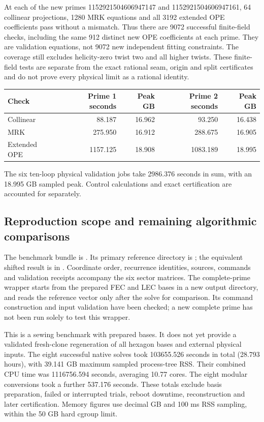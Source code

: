 \documentclass[11pt]{article}
\begin{document}
At each of the new primes 1152921504606947147 and 1152921504606947161,
64 collinear projections, 1280 MRK equations and all 3192 extended OPE
coefficients pass without a mismatch. Thus there are 9072 successful
finite-field checks, including the same 912 distinct new OPE coefficients
at each prime. They are validation equations, not 9072 new independent
fitting constraints. The coverage still excludes helicity-zero twist two
and all higher twists. These finite-field tests are separate from the exact
rational seam, origin and split certificates and do not prove every
physical limit as a rational identity.

\begin{center}
\begin{tabular}{lrrrr}\toprule
Check & Prime 1 seconds & Peak GB & Prime 2 seconds & Peak GB\\\midrule
Collinear & 88.187 & 16.962 & 93.250 & 16.438\\
MRK & 275.950 & 16.912 & 288.675 & 16.905\\
Extended OPE & 1157.125 & 18.908 & 1083.189 & 18.995\\
\bottomrule
\end{tabular}
\end{center}
The six ten-loop physical validation jobs take 2986.376 seconds
in sum, with an 18.995 GB sampled peak. Control calculations and exact
certification are accounted for separately.

\subsection{Reproduction scope and remaining algorithmic comparisons}
The benchmark bundle is . Its primary
reference directory is ; the equivalent shifted result
is in . Coordinate order, recurrence identities, sources,
commands and validation receipts accompany the six sector matrices. The
complete-prime wrapper starts from the prepared FEC and LEC bases in a new
output directory, and reads the reference vector only after the solve for
comparison. Its command construction and input validation have been checked;
a new complete prime has not been run solely to test this wrapper.

This is a sewing benchmark with prepared bases. It does not yet provide a
validated fresh-clone regeneration of all hexagon bases and external physical
inputs. The eight successful native solves took 103655.526 seconds in total
(28.793 hours), with 39.141 GB maximum sampled process-tree RSS. Their combined
CPU time was 1116756.594 seconds, averaging 10.77 cores. The eight modular
conversions took a further 537.176 seconds. These totals exclude basis
preparation, failed or interrupted trials, reboot downtime, reconstruction
and later certification. Memory figures use decimal GB and 100 ms RSS
sampling, within the 50 GB hard cgroup limit.
\end{document}
